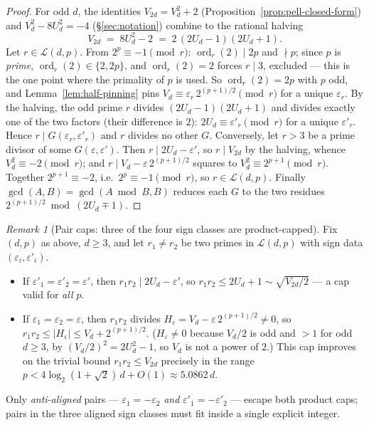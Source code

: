 \documentclass[11pt]{amsart}
\theoremstyle{plain}
\theoremstyle{definition}
\theoremstyle{remark}
\newtheorem{remark}[theorem]{Remark}
\numberwithin{equation}{section}
\newcommand{\ord}{\operatorname{ord}}
\begin{document}
\begin{proof}
For odd $d$, the identities $V_{2 d} = V_d^2 + 2$ (Proposition~\ref{prop:pell-closed-form}) and $V_d^2 - 8 U_d^2 = -4$ (\S\ref{sec:notation}) combine to the rational halving
\[
  V_{2 d} \;=\; 8 U_d^2 - 2 \;=\; 2\, (2 U_d - 1)(2 U_d + 1).
\]
Let $r \in \mathcal{L}(d, p)$. From $2^p \equiv -1 \pmod r$: $\ord_r(2) \mid 2 p$ and $\nmid p$; since $p$ is \emph{prime}, $\ord_r(2) \in \{2, 2 p\}$, and $\ord_r(2) = 2$ forces $r \mid 3$, excluded --- this is the one point where the primality of $p$ is used. So $\ord_r(2) = 2 p$ with $p$ odd, and Lemma~\ref{lem:half-pinning} pins $V_d \equiv \varepsilon_r\, 2^{(p+1)/2} \pmod r$ for a unique $\varepsilon_r$. By the halving, the odd prime $r$ divides $(2 U_d - 1)(2 U_d + 1)$ and divides exactly one of the two factors (their difference is $2$): $2 U_d \equiv \varepsilon'_r \pmod r$ for a unique $\varepsilon'_r$. Hence $r \mid G(\varepsilon_r, \varepsilon'_r)$ and $r$ divides no other $G$. Conversely, let $r > 3$ be a prime divisor of some $G(\varepsilon, \varepsilon')$. Then $r \mid 2 U_d - \varepsilon'$, so $r \mid V_{2 d}$ by the halving, whence $V_d^2 \equiv -2 \pmod r$; and $r \mid V_d - \varepsilon\, 2^{(p+1)/2}$ squares to $V_d^2 \equiv 2^{p+1} \pmod r$. Together $2^{p+1} \equiv -2$, i.e.\ $2^p \equiv -1 \pmod r$, so $r \in \mathcal{L}(d, p)$. Finally $\gcd(A, B) = \gcd(A \bmod B, B)$ reduces each $G$ to the two residues $2^{(p+1)/2} \bmod (2 U_d \mp 1)$.
\end{proof}

\begin{remark}[Pair caps: three of the four sign classes are product-capped]\label{rem:pair-caps}
Fix $(d, p)$ as above, $d \geq 3$, and let $r_1 \neq r_2$ be two primes in $\mathcal{L}(d, p)$ with sign data $(\varepsilon_i, \varepsilon'_i)$.
\begin{itemize}
\item If $\varepsilon'_1 = \varepsilon'_2 = \varepsilon'$, then $r_1 r_2 \mid 2 U_d - \varepsilon'$, so $r_1 r_2 \leq 2 U_d + 1 \sim \sqrt{V_{2 d}/2}$ --- a cap valid for \emph{all} $p$.
\item If $\varepsilon_1 = \varepsilon_2 = \varepsilon$, then $r_1 r_2$ divides $H_\varepsilon = V_d - \varepsilon\, 2^{(p+1)/2} \neq 0$, so $r_1 r_2 \leq |H_\varepsilon| \leq V_d + 2^{(p+1)/2}$. ($H_\varepsilon \neq 0$ because $V_d/2$ is odd and $> 1$ for odd $d \geq 3$, by $(V_d/2)^2 = 2 U_d^2 - 1$, so $V_d$ is not a power of $2$.) This cap improves on the trivial bound $r_1 r_2 \leq V_{2 d}$ precisely in the range $p < 4 \log_2(1 + \sqrt 2)\, d + O(1) \approx 5.0862\, d$.
\end{itemize}
Only \emph{anti-aligned} pairs --- $\varepsilon_1 = -\varepsilon_2$ \emph{and} $\varepsilon'_1 = -\varepsilon'_2$ --- escape both product caps; pairs in the three aligned sign classes must fit inside a single explicit integer.
\end{remark}
\end{document}
